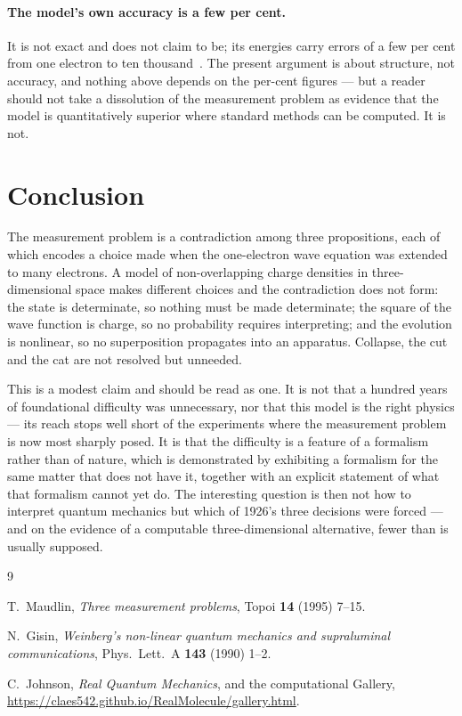 \documentclass[11pt]{article}
\begin{document}
\paragraph{The model's own accuracy is a few per cent.} It is not exact and does not claim to be;
its energies carry errors of a few per cent from one electron to ten thousand~\cite{RealQM}. The
present argument is about structure, not accuracy, and nothing above depends on the per-cent
figures --- but a reader should not take a dissolution of the measurement problem as evidence that
the model is quantitatively superior where standard methods can be computed. It is not.

\section{Conclusion}\label{sec:conclusion}

The measurement problem is a contradiction among three propositions, each of which encodes a choice
made when the one-electron wave equation was extended to many electrons. A model of non-overlapping
charge densities in three-dimensional space makes different choices and the contradiction does not
form: the state is determinate, so nothing must be made determinate; the square of the wave
function is charge, so no probability requires interpreting; and the evolution is nonlinear, so no
superposition propagates into an apparatus. Collapse, the cut and the cat are not resolved but
unneeded.

This is a modest claim and should be read as one. It is not that a hundred years of foundational
difficulty was unnecessary, nor that this model is the right physics --- its reach stops well short
of the experiments where the measurement problem is now most sharply posed. It is that the
difficulty is a feature of a formalism rather than of nature, which is demonstrated by exhibiting a
formalism for the same matter that does not have it, together with an explicit statement of what
that formalism cannot yet do. The interesting question is then not how to interpret quantum
mechanics but which of 1926's three decisions were forced --- and on the evidence of a computable
three-dimensional alternative, fewer than is usually supposed.

\begin{thebibliography}{9}

 T.~Maudlin, \emph{Three measurement problems}, Topoi \textbf{14} (1995)
7--15.

 N.~Gisin, \emph{Weinberg's non-linear quantum mechanics and supraluminal
communications}, Phys.\ Lett.\ A \textbf{143} (1990) 1--2.

 C.~Johnson, \emph{Real Quantum Mechanics}, and the computational Gallery,
\url{https://claes542.github.io/RealMolecule/gallery.html}.

\end{thebibliography}
\end{document}
